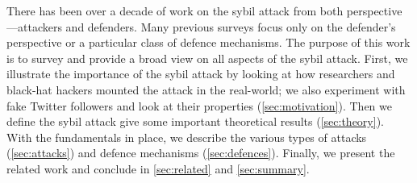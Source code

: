 There has been over a decade of work on the sybil attack from both
perspective---attackers and defenders. Many previous surveys focus only on the
defender's perspective or a particular class of defence mechanisms. The purpose
of this work is to survey and provide a broad view on all aspects of the sybil
attack. First, we illustrate the importance of the sybil attack by looking at
how researchers and black-hat hackers mounted the attack in the real-world; we
also experiment with fake Twitter followers and look at their properties
(\autoref{sec:motivation}). Then we define the sybil attack give some important
theoretical results (\autoref{sec:theory}). With the fundamentals in place, we
describe the various types of attacks (\autoref{sec:attacks}) and defence
mechanisms (\autoref{sec:defences}).
Finally, we present the related work and conclude in \autoref{sec:related} and
\autoref{sec:summary}.

